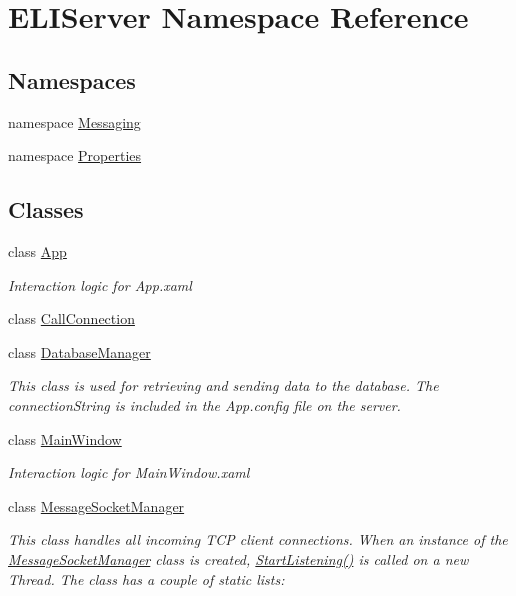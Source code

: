 \hypertarget{namespace_e_l_i_server}{}\section{E\+L\+I\+Server Namespace Reference}
\label{namespace_e_l_i_server}
\subsection*{Namespaces}
\begin{DoxyCompactItemize}
\item 
namespace \hyperlink{namespace_e_l_i_server_1_1_messaging}{Messaging}
\item 
namespace \hyperlink{namespace_e_l_i_server_1_1_properties}{Properties}
\end{DoxyCompactItemize}
\subsection*{Classes}
\begin{DoxyCompactItemize}
\item 
class \hyperlink{class_e_l_i_server_1_1_app}{App}
\begin{DoxyCompactList}\small\item\em Interaction logic for App.\+xaml \end{DoxyCompactList}\item 
class \hyperlink{class_e_l_i_server_1_1_call_connection}{Call\+Connection}
\item 
class \hyperlink{class_e_l_i_server_1_1_database_manager}{Database\+Manager}
\begin{DoxyCompactList}\small\item\em This class is used for retrieving and sending data to the database. The connection\+String is included in the App.\+config file on the server. \end{DoxyCompactList}\item 
class \hyperlink{class_e_l_i_server_1_1_main_window}{Main\+Window}
\begin{DoxyCompactList}\small\item\em Interaction logic for Main\+Window.\+xaml \end{DoxyCompactList}\item 
class \hyperlink{class_e_l_i_server_1_1_message_socket_manager}{Message\+Socket\+Manager}
\begin{DoxyCompactList}\small\item\em This class handles all incoming T\+CP client connections. When an instance of the \hyperlink{class_e_l_i_server_1_1_message_socket_manager}{Message\+Socket\+Manager} class is created, \hyperlink{class_e_l_i_server_1_1_message_socket_manager_ab5d2f61a349046960ae63303ff1c2130}{Start\+Listening()} is called on a new Thread. The class has a couple of static lists\+: \end{DoxyCompactList}\end{DoxyCompactItemize}
